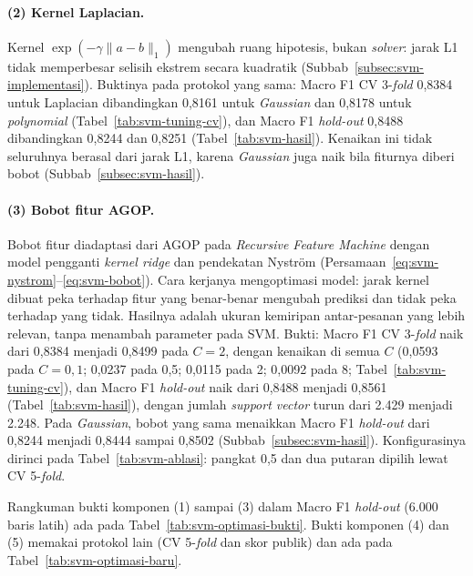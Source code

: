 \paragraph{(2) Kernel Laplacian.} Kernel $\exp(-\gamma\lVert a-b\rVert_1)$ \cite{chapelle1999histogram} mengubah ruang hipotesis, bukan \textit{solver}: jarak L1 tidak memperbesar selisih ekstrem secara kuadratik (Subbab~\ref{subsec:svm-implementasi}). Buktinya pada protokol yang sama: Macro F1 CV 3-\textit{fold} 0,8384 untuk Laplacian dibandingkan 0,8161 untuk \textit{Gaussian} dan 0,8178 untuk \textit{polynomial} (Tabel~\ref{tab:svm-tuning-cv}), dan Macro F1 \textit{hold-out} 0,8488 dibandingkan 0,8244 dan 0,8251 (Tabel~\ref{tab:svm-hasil}). Kenaikan ini tidak seluruhnya berasal dari jarak L1, karena \textit{Gaussian} juga naik bila fiturnya diberi bobot (Subbab~\ref{subsec:svm-hasil}).

\paragraph{(3) Bobot fitur AGOP.} Bobot fitur diadaptasi dari AGOP pada \textit{Recursive Feature Machine} \cite{radhakrishnan2024rfm} dengan model pengganti \textit{kernel ridge} \cite{saunders1998ridge} dan pendekatan Nystr\"om \cite{williams2001nystrom} (Persamaan~\eqref{eq:svm-nystrom}--\eqref{eq:svm-bobot}). Cara kerjanya mengoptimasi model: jarak kernel dibuat peka terhadap fitur yang benar-benar mengubah prediksi dan tidak peka terhadap yang tidak. Hasilnya adalah ukuran kemiripan antar-pesanan yang lebih relevan, tanpa menambah parameter pada SVM. Bukti: Macro F1 CV 3-\textit{fold} naik dari 0,8384 menjadi 0,8499 pada $C = 2$, dengan kenaikan di semua $C$ (0,0593 pada $C = 0{,}1$; 0,0237 pada 0,5; 0,0115 pada 2; 0,0092 pada 8; Tabel~\ref{tab:svm-tuning-cv}), dan Macro F1 \textit{hold-out} naik dari 0,8488 menjadi 0,8561 (Tabel~\ref{tab:svm-hasil}), dengan jumlah \textit{support vector} turun dari 2.429 menjadi 2.248. Pada \textit{Gaussian}, bobot yang sama menaikkan Macro F1 \textit{hold-out} dari 0,8244 menjadi 0,8444 sampai 0,8502 (Subbab~\ref{subsec:svm-hasil}). Konfigurasinya dirinci pada Tabel~\ref{tab:svm-ablasi}: pangkat 0,5 dan dua putaran dipilih lewat CV 5-\textit{fold}.

Rangkuman bukti komponen (1) sampai (3) dalam Macro F1 \textit{hold-out} (6.000 baris latih) ada pada Tabel~\ref{tab:svm-optimasi-bukti}. Bukti komponen (4) dan (5) memakai protokol lain (CV 5-\textit{fold} dan skor publik) dan ada pada Tabel~\ref{tab:svm-optimasi-baru}.

